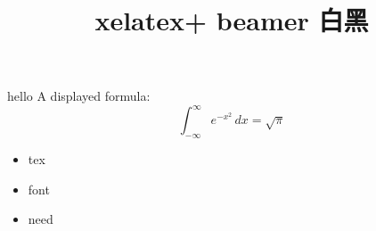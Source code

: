 \documentclass{beamer}
\begin{document}
\title{xelatex+ beamer 白黑} 
\frame{\titlepage}

\begin{frame} {hello}
A displayed formula:
\[
  \int_{-\infty}^\infty e^{-x^2} \, dx = \sqrt{\pi}
\]
\begin{itemize}
\item tex
\item font  
\item need
\end{itemize}
\end{frame}
\end{document}
